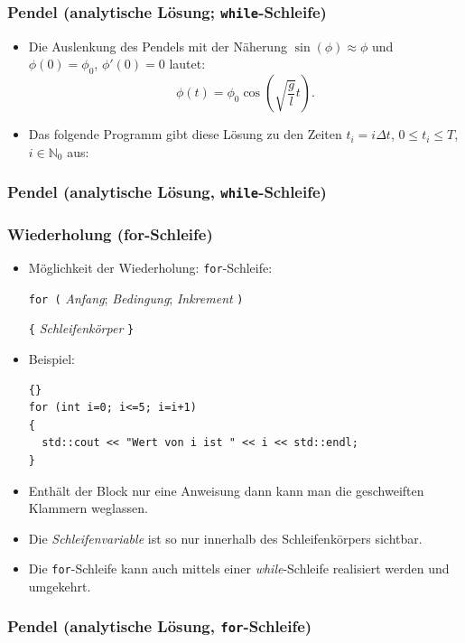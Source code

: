 \documentclass[ignorenonframetext,12pt]{beamer}
\theoremstyle{definition}
\theoremstyle{definition}
\begin{document}
\begin{frame}[fragile]
\frametitle{Pendel (analytische Lösung; \lstinline{while}-Schleife)}
\begin{itemize}
\item Die Auslenkung des Pendels mit der Näherung
  $\sin(\phi)\approx\phi$ und $\phi(0)=\phi_0$, $\phi'(0)=0$ lautet:
$$ \phi(t) = \phi_0 \cos\left(\sqrt{\frac{g}{l}} t\right) .$$
\item Das folgende Programm gibt diese Lösung zu den Zeiten $t_i=i
  \Delta t$, $0\leq t_i \leq T$, $i\in\mathbb{N}_0$ aus:
\end{itemize}
\end{frame}
\begin{frame}[fragile]
\frametitle<presentation>{Pendel (analytische Lösung, \lstinline{while}-Schleife)}

\end{frame}

\begin{frame}[fragile]
\frametitle{Wiederholung (for-Schleife)}
\begin{itemize}
\item Möglichkeit der Wiederholung: \lstinline{for}-Schleife:

\lstinline{for (} \textsl{Anfang}; \textsl{Bedingung};
\textsl{Inkrement} \lstinline{)}

\lstinline!{! \textsl{Schleifenkörper} \lstinline!}!
\item Beispiel:
{\scriptsize\begin{lstlisting}{}
for (int i=0; i<=5; i=i+1)
{
  std::cout << "Wert von i ist " << i << std::endl;
}
\end{lstlisting}}
\item Enthält der Block nur eine Anweisung dann kann man die
  geschweiften Klammern weglassen.
\item Die \textsl{Schleifenvariable} ist so nur innerhalb des
  Schleifenkörpers sichtbar.
\item Die \lstinline{for}-Schleife kann auch mittels einer
  \textsl{while}-Schleife realisiert werden und umgekehrt.
\end{itemize}
\end{frame}

\begin{frame}[fragile]
\frametitle{Pendel (analytische Lösung, \lstinline{for}-Schleife)}

\end{frame}
\end{document}
